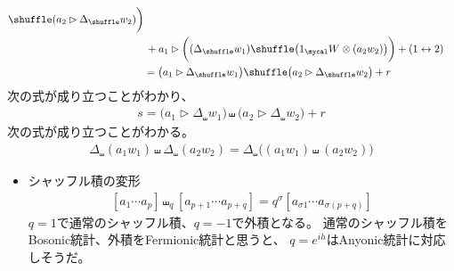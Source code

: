 {\begin{equation*}
\begin{split}
			\shuffle(a_2\rhd\Delta_\shuffle w_2)\biggr) \\
		&\,+ a_1\rhd\biggl((\Delta_\shuffle w_1)
			\shuffle\bigl(1_\W\otimes(a_2w_2)\bigr)\biggr) + (1\swap2) \\
		&= \bigl(a_1\rhd\Delta_\shuffle w_1\bigr)
			\shuffle\bigl(a_2\rhd\Delta_\shuffle w_2\bigr) + r
	\end{split}\end{equation*}
	次の式が成り立つことがわかり、
	\begin{equation*}\begin{split}
		s = \bigl(a_1\rhd\Delta_\shuffle w_1\bigr)
		\shuffle\bigl(a_2\rhd\Delta_\shuffle w_2\bigr) + r
	\end{split}\end{equation*}
	次の式が成り立つことがわかる。
	\begin{equation*}\begin{split}
		\Delta_\shuffle(a_1w_1)\shuffle\Delta_\shuffle(a_2w_2)
		= \Delta_\shuffle\bigl((a_1w_1)\shuffle(a_2w_2)\bigr)
	\end{split}\end{equation*}

	\begin{todo}[知りたいこと]\label{todo:知りたいこと} %
		\begin{itemize}\setlength{\itemsep}{-1mm} %
			\item シャッフル積の変形
			\begin{equation*}\begin{split}
				[a_1\cdots a_p]\shuffle_q[a_{p+1}\cdots a_{p+q}]
				= q^{\sigma} [a_{\sigma1}\cdots a_{\sigma(p+q)}]
			\end{split}\end{equation*}
			$q=1$で通常のシャッフル積、$q=-1$で外積となる。
			通常のシャッフル積をBosonic統計、外積をFermionic統計と思うと、
			$q=e^{ih}$はAnyonic統計に対応しそうだ。
		\end{itemize} %
	\end{todo} %
}\endgroup %

